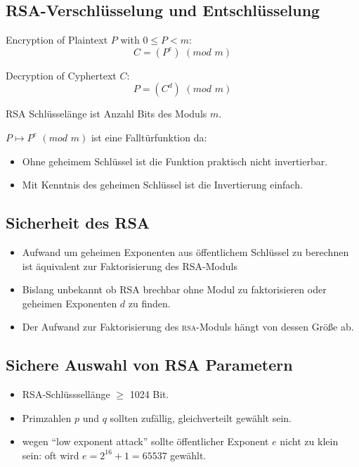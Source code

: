 \subsection{RSA-Verschlüsselung und Entschlüsselung}
Encryption of Plaintext $P$ with $0 \le P < m$:
$$ C = (P^e) \hspace{4pt} (mod \hspace{4pt} m)  $$

Decryption of Cyphertext $C$:
$$ P = (C^d) \hspace{4pt} (mod \hspace{4pt} m)  $$

RSA Schlüsselänge ist Anzahl Bits des Moduls $m$.

$ P \mapsto P^e \hspace{4pt} (mod \hspace{4pt} m) $ ist eine Falltürfunktion da:
\begin{itemize}
  \item Ohne geheimem Schlüssel ist die Funktion praktisch nicht invertierbar.
  \item Mit Kenntnis des geheimen Schlüssel ist die Invertierung einfach.
\end{itemize}

\subsection{Sicherheit des RSA}
\begin{itemize}
  \item Aufwand um geheimen Exponenten aus öffentlichem Schlüssel zu berechnen ist äquivalent zur Faktorisierung des RSA-Moduls
  \item Bislang unbekannt ob RSA brechbar ohne Modul zu faktorisieren oder geheimen Exponenten $d$ zu finden.
  \item Der Aufwand zur Faktorisierung des \textsc{rsa}-Moduls hängt von dessen Größe ab.
\end{itemize}

\subsection{Sichere Auswahl von RSA Parametern}
\begin{itemize}
  \item RSA-Schlüsssellänge $\geq$ 1024 Bit.
  \item Primzahlen $p$ und $q$ sollten zufällig, gleichverteilt gewählt sein.
  \item wegen "`low exponent attack"' sollte öffentlicher Exponent $e$ nicht zu klein sein: oft wird $e = 2^{16}+1 = 65537$ gewählt.
\end{itemize}







